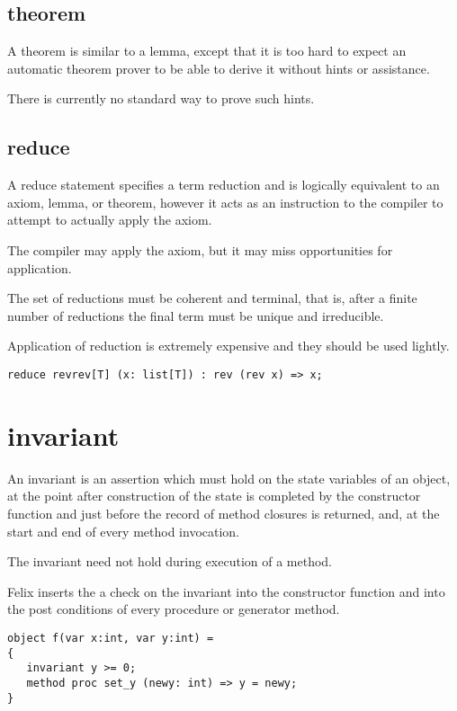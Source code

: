 \documentclass[oneside]{book}
\begin{document}
\subsection{theorem}
A theorem is similar to a lemma, except that it is 
too hard to expect an automatic theorem prover
to be able to derive it without hints or assistance.

There is currently no standard way to prove such hints.

\subsection{reduce}
A reduce statement specifies a term reduction and is logically
equivalent to an axiom, lemma, or theorem, however it acts
as an instruction to the compiler to attempt to actually 
apply the axiom.

The compiler may apply the axiom, but it may miss opportunities
for application.

The set of reductions must be coherent and terminal, 
that is, after a finite number of reductions the final
term must be unique and irreducible. 

Application of reduction is extremely expensive and they
should be used lightly.

\begin{verbatim}
reduce revrev[T] (x: list[T]) : rev (rev x) => x;
\end{verbatim}



\section{invariant}
An invariant is an assertion which must hold on the state variables
of an object, at the point after construction of the state
is completed by the constructor function and just before the
record of method closures is returned, and, at the start and
end of every method invocation.

The invariant need not hold during execution of a method.

Felix inserts the a check on the invariant into the constructor function
and into the post conditions of every procedure or generator
method.


\begin{verbatim}
object f(var x:int, var y:int) =
{
   invariant y >= 0;
   method proc set_y (newy: int) => y = newy;
}
\end{verbatim}
\end{document}
